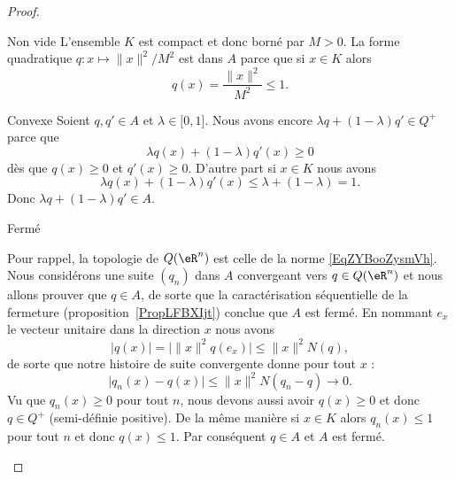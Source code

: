 \begin{proof}
\begin{subproof}
            \begin{subproof}
            \item[Non vide]
                L'ensemble \( K\) est compact et donc borné par \( M>0\). La forme quadratique \( q\colon x\mapsto \| x \|^2/M^2\) est dans \( A\) parce que si \( x\in K\) alors
                \begin{equation}
                    q(x)=\frac{ \| x \|^2 }{ M^2 }\leq 1.
                \end{equation}
            \item[Convexe]
                Soient \( q,q'\in A\) et \( \lambda\in\mathopen[ 0 , 1 \mathclose]\). Nous avons encore \( \lambda q+(1-\lambda)q'\in Q^+\) parce que
                \begin{equation}
                    \lambda q(x)+(1-\lambda)q'(x)\geq 0
                \end{equation}
                dès que \( q(x)\geq 0\) et \( q'(x)\geq 0\).
            D'autre part si \( x\in K\) nous avons
            \begin{equation}
                \lambda q(x)+(1-\lambda)q'(x)\leq \lambda+(1-\lambda)=1.
            \end{equation}
            Donc \( \lambda q+(1-\lambda)q'\in A\).

        \item[Fermé]

            Pour rappel, la topologie de \( Q(\eR^n)\) est celle de la norme \eqref{EqZYBooZysmVh}. Nous considérons une suite \( (q_n)\) dans \( A\) convergeant vers \( q\in Q(\eR^n)\) et nous allons prouver que \( q\in A\), de sorte que la caractérisation séquentielle de la fermeture (proposition~\ref{PropLFBXIjt}) conclue que \( A\) est fermé. En nommant \( e_x\) le vecteur unitaire dans la direction \( x\) nous avons
            \begin{equation}
                \big| q(x) \big|=\big| \| x \|^2q(e_x) \big|\leq \| x \|^2N(q),
            \end{equation}
            de sorte que notre histoire de suite convergente  donne pour tout \( x\) :
            \begin{equation}
                \big| q_n(x)-q(x) \big|\leq \| x \|^2N(q_n-q)\to 0.
            \end{equation}
            Vu que \( q_n(x)\geq 0\) pour tout \( n\), nous devons aussi avoir \( q(x)\geq 0\) et donc \( q\in Q^+\) (semi-définie positive). De la même manière si \( x\in K\) alors \( q_n(x)\leq 1\) pour tout \( n\) et donc \( q(x)\leq 1\). Par conséquent \( q\in A\) et \( A\) est fermé.


\end{subproof}
\end{subproof}
\end{proof}
